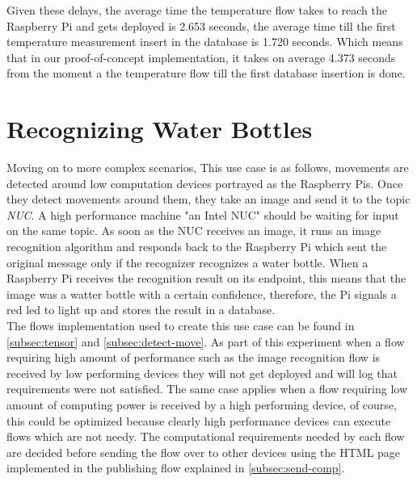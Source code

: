 \noindent Given these delays, the average time the temperature flow takes to reach the Raspberry Pi and gets deployed is 2.653 seconds, the average time till the first temperature measurement insert in the database    is 1.720 seconds. Which means that in our proof-of-concept implementation, it takes on average 4.373 seconds from the moment a
the temperature flow till the first database  insertion is done.


\section{Recognizing Water Bottles } \label{sec:rwb}


Moving on to more complex scenarios, This use case  is as follows, movements are detected around low computation devices portrayed as the Raspberry Pis. Once they detect movements around them, they take an image and send it to the topic \textit{NUC}. A high performance machine "an Intel NUC" should be waiting for input on the same topic. As soon as the NUC  receives an image, it runs an image recognition algorithm and responds back to the Raspberry Pi which sent the original message  only if the recognizer recognizes a water bottle. When a Raspberry Pi receives the recognition result on its endpoint, this means that the image was a watter bottle with a certain confidence, therefore, the Pi signals a red led to light up and stores the result in a database. \\ 

\noindent The flows implementation used to create this use case can be found in \ref{subsec:tensor} and \ref{subsec:detect-move}.  As part of this experiment when a flow requiring high amount of performance such as the image recognition flow is received by low performing devices they will not get deployed and  will log that requirements were not satisfied. The same case applies when a flow requiring low amount of computing power is received by a high performing device, of course, this could be optimized because clearly high performance devices can execute flows which are not needy. The computational requirements needed by each flow are decided before sending the flow over to other devices using the HTML page implemented in the publishing flow explained in \ref{subsec:send-comp}.\\ 

